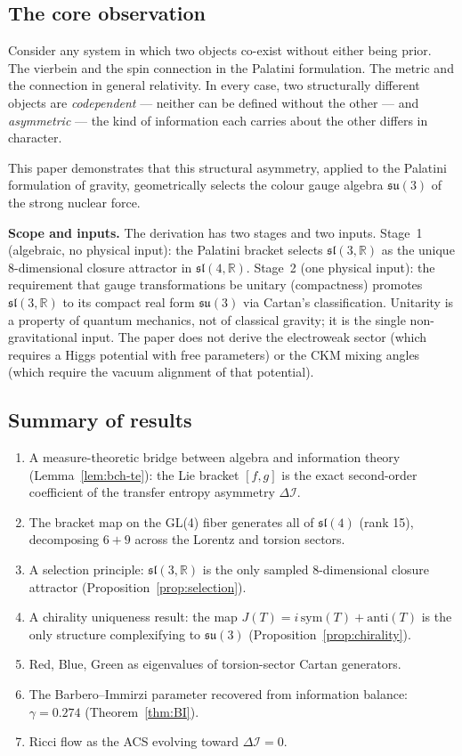 \documentclass[11pt,a4paper]{article}
\theoremstyle{plain}
\theoremstyle{definition}
\theoremstyle{remark}
\begin{document}
\subsection{The core observation}

Consider any system in which two objects co-exist without either being prior.
The vierbein and the spin connection in the Palatini formulation.
The metric and the connection in general relativity.
In every case, two structurally different objects are \emph{codependent} ---
neither can be defined without the other --- and \emph{asymmetric} --- 
the kind of information each carries about the other differs in character.

This paper demonstrates that this structural asymmetry, applied to the
Palatini formulation of gravity, geometrically selects the colour gauge
algebra $\mathfrak{su}(3)$ of the strong nuclear force.

\textbf{Scope and inputs.}
The derivation has two stages and two inputs.
Stage~1 (algebraic, no physical input): the Palatini bracket selects
$\mathfrak{sl}(3,\mathbb{R})$ as the unique 8-dimensional closure
attractor in $\mathfrak{sl}(4,\mathbb{R})$.
Stage~2 (one physical input): the requirement that gauge transformations
be unitary (compactness) promotes $\mathfrak{sl}(3,\mathbb{R})$ to its
compact real form $\mathfrak{su}(3)$ via Cartan's classification.
Unitarity is a property of quantum mechanics, not of classical gravity;
it is the single non-gravitational input.  The paper does not derive
the electroweak sector (which requires a Higgs potential with free
parameters) or the CKM mixing angles (which require the vacuum
alignment of that potential).

\subsection{Summary of results}

\begin{enumerate}[label=(\roman*)]
\item A measure-theoretic bridge between algebra and information theory
  (Lemma~\ref{lem:bch-te}): the Lie bracket $[f,g]$ is the exact
  second-order coefficient of the transfer entropy asymmetry $\Delta\mathcal{I}$.
\item The bracket map on the GL(4) fiber generates all of $\mathfrak{sl}(4)$
  (rank 15), decomposing $6+9$ across the Lorentz and torsion sectors.
\item A selection principle: $\mathfrak{sl}(3,\mathbb{R})$ is the only sampled
  8-dimensional closure attractor (Proposition~\ref{prop:selection}).
\item A chirality uniqueness result: the map $J(T) = i\,\mathrm{sym}(T) + \mathrm{anti}(T)$
  is the only structure complexifying to $\mathfrak{su}(3)$
  (Proposition~\ref{prop:chirality}).
\item Red, Blue, Green as eigenvalues of torsion-sector Cartan generators.
\item The Barbero--Immirzi parameter recovered from information balance:
  $\gamma = 0.274$ (Theorem~\ref{thm:BI}).
\item Ricci flow as the ACS evolving toward $\Delta\mathcal{I} = 0$.
\end{enumerate}
\end{document}
